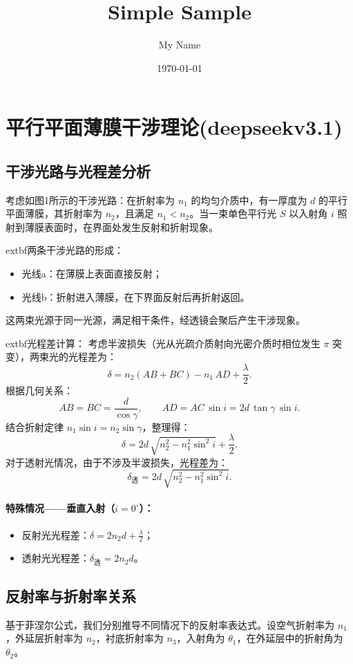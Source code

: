 \documentclass{ctexart} %
\title{Simple Sample} %
\author{My Name} %
\date{\today} %
\begin{document}
\maketitle %

\section{平行平面薄膜干涉理论(deepseekv3.1)}
\subsection{干涉光路与光程差分析}
考虑如图1所示的干涉光路：在折射率为 \(n_1\) 的均匀介质中，有一厚度为 \(d\) 的平行平面薄膜，其折射率为 \(n_2\)，且满足 \(n_1 < n_2\)。当一束单色平行光 \(S\) 以入射角 \(i\) 照射到薄膜表面时，在界面处发生反射和折射现象。

extbf{两条干涉光路的形成：}
\begin{itemize}
    \item 光线a：在薄膜上表面直接反射；
    \item 光线b：折射进入薄膜，在下界面反射后再折射返回。
\end{itemize}

这两束光源于同一光源，满足相干条件，经透镜会聚后产生干涉现象。

extbf{光程差计算：}
考虑半波损失（光从光疏介质射向光密介质时相位发生 \(\pi\) 突变），两束光的光程差为：
\[
    \delta = n_2(AB + BC) - n_1\, AD + \frac{\lambda}{2}.
\]
根据几何关系：
\[
    AB = BC = \frac{d}{\cos\gamma},\qquad
    AD = AC\, \sin i = 2d\, \tan\gamma\, \sin i.
\]
结合折射定律 \(n_1 \sin i = n_2 \sin\gamma\)，整理得：
\[
    \delta = 2d\, \sqrt{n_2^2 - n_1^2 \sin^2 i} + \frac{\lambda}{2}.
\]
对于透射光情况，由于不涉及半波损失，光程差为：
\[
    \delta_{\text{透}} = 2d\, \sqrt{n_2^2 - n_1^2 \sin^2 i}.
\]

\paragraph{特殊情况——垂直入射（\(i = 0^\circ\)）：}
\begin{itemize}
    \item 反射光光程差：\(\delta = 2n_2 d + \tfrac{\lambda}{2}\)；
    \item 透射光光程差：\(\delta_{\text{透}} = 2n_2 d\)。
\end{itemize}

\subsection{反射率与折射率关系}
基于菲涅尔公式，我们分别推导不同情况下的反射率表达式。设空气折射率为 \(n_1\)，外延层折射率为 \(n_2\)，衬底折射率为 \(n_3\)，入射角为 \(\theta_1\)，在外延层中的折射角为 \(\theta_2\)。
\end{document}
